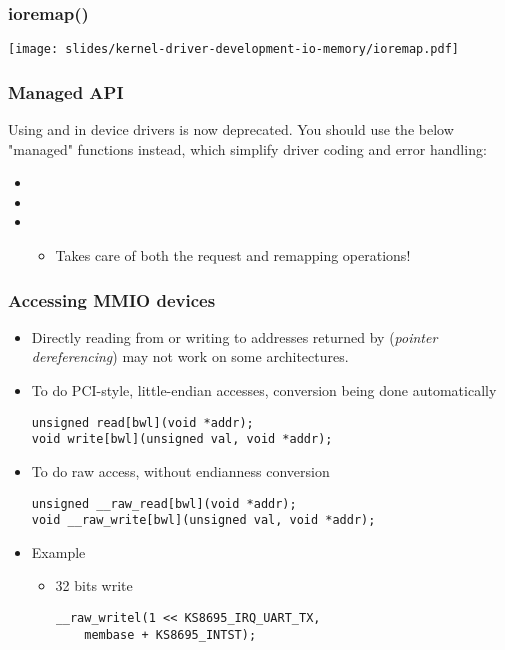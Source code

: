 \begin{frame}[fragile]
  \frametitle{ioremap()}
  \begin{center}
    \texttt{[image: slides/kernel-driver-development-io-memory/ioremap.pdf]}\\
  \end{center}
\end{frame}

\begin{frame}
  \frametitle{Managed API}
  Using  and  in device
  drivers is now deprecated. You should use the below "managed"
  functions instead, which simplify driver coding and error handling:
  \begin{itemize}
  \item {}
  \item {}
  \item {}
        \begin{itemize}
	\item Takes care of both the request and remapping operations!
	\end{itemize}
  \end{itemize}
\end{frame}

\begin{frame}[fragile]
  \frametitle{Accessing MMIO devices}
  \begin{itemize}
  \item Directly reading from or writing to addresses returned by
     (\emph{pointer dereferencing}) may not work on some
    architectures.
  \item To do PCI-style, little-endian accesses, conversion being done
    automatically
\begin{verbatim}
unsigned read[bwl](void *addr);
void write[bwl](unsigned val, void *addr);
\end{verbatim}
  \item To do raw access, without endianness conversion
\begin{verbatim}
unsigned __raw_read[bwl](void *addr);
void __raw_write[bwl](unsigned val, void *addr);
\end{verbatim}
  \item Example
    \begin{itemize}
    \item 32 bits write
\begin{verbatim}
__raw_writel(1 << KS8695_IRQ_UART_TX,
    membase + KS8695_INTST);
\end{verbatim}
    \end{itemize}
  \end{itemize}
\end{frame}

